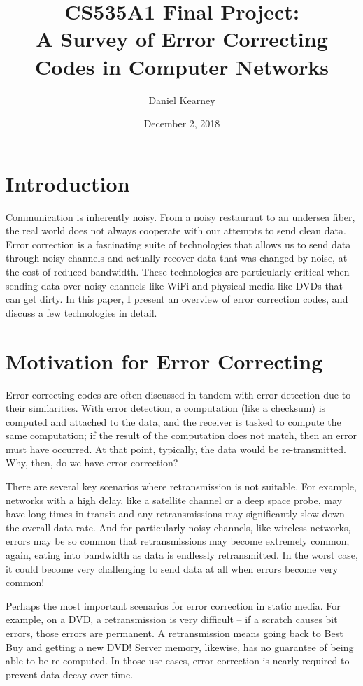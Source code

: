 \documentclass[12pt]{article}
\title{
  CS535A1 Final Project: \\ A Survey of Error Correcting Codes in Computer Networks}
\author{Daniel Kearney}
\date{December 2, 2018}
\begin{document}
\maketitle

\section{Introduction}

Communication is inherently noisy. From a noisy restaurant to an undersea fiber, the real world does not always cooperate with our attempts to send clean data. Error correction is a fascinating suite of technologies that allows us to send data through noisy channels and actually recover data that was changed by noise, at the cost of reduced bandwidth. These technologies are particularly critical when sending data over noisy channels like WiFi and physical media like DVDs that can get dirty. In this paper, I present an overview of error correction codes, and discuss a few technologies in detail.

\section{Motivation for Error Correcting}

Error correcting codes are often discussed in tandem with error detection due to their similarities. With error detection, a computation (like a checksum) is computed and attached to the data, and the receiver is tasked to compute the same computation; if the result of the computation does not match, then an error must have occurred. At that point, typically, the data would be re-transmitted. Why, then, do we have error correction?

There are several key scenarios where retransmission is not suitable. For example, networks with a high delay, like a satellite channel or a deep space probe, may have long times in transit and any retransmissions may significantly slow down the overall data rate. \cite{pless} And for particularly noisy channels, like wireless networks, errors may be so common that retransmissions may become extremely common, again, eating into bandwidth as data is endlessly retransmitted. In the worst case, it could become very challenging to send data at all when errors become very common!

Perhaps the most important scenarios for error correction in static media. For example, on a DVD, a retransmission is very difficult -- if a scratch causes bit errors, those errors are permanent. A retransmission means going back to Best Buy and getting a new DVD! Server memory, likewise, has no guarantee of being able to be re-computed. In those use cases, error correction is nearly required to prevent data decay over time. \cite{pless}
\end{document}
